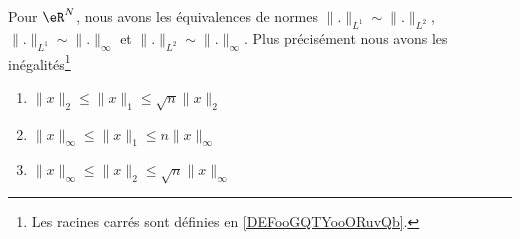 \begin{proposition} \label{PropLJEJooMOWPNi}
	Pour \( \eR^N\), nous avons les équivalences de normes \( \| . \|_{L^1}\sim\| . \|_{L^2}\), \( \| . \|_{L^1}\sim\| . \|_{\infty}\) et \( \| . \|_{L^2}\sim\| . \|_{\infty}\). Plus précisément nous avons les inégalités\footnote{Les racines carrés sont définies en \ref{DEFooGQTYooORuvQb}.}
	\begin{enumerate}
		\item\label{ItemABSGooQODmLNi}
		      \(  \| x \|_2\leq \| x \|_1\leq\sqrt{n}\| x \|_2\)
		\item\label{ItemABSGooQODmLNii}
		      \( \| x \|_{\infty}\leq \| x \|_1\leq n \| x \|_{\infty}\)
		\item\label{ItemABSGooQODmLNiii}
		      \( \| x \|_{\infty}\leq \| x \|_2\leq \sqrt{n}\| x \|_{\infty}\)
	\end{enumerate}
\end{proposition}

